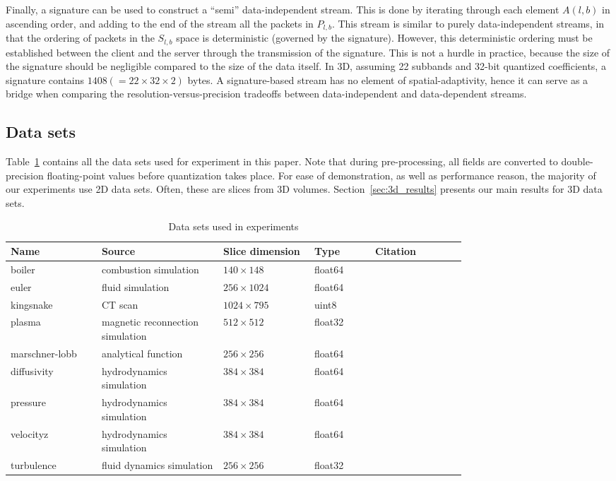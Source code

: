 Finally, a signature can be used to construct a ``semi'' data-independent stream. This is done by
iterating through each element $A(l,b)$ in ascending order, and adding to the end of the stream all
the packets in $P_{l,b}$. This stream is similar to purely data-independent streams, in that the
ordering of packets in the $S_{l,b}$ space is deterministic (governed by the signature). However,
this deterministic ordering must be established between the client and the server through the
transmission of the signature. This is not a hurdle in practice, because the size of the signature
should be negligible compared to the size of the data itself. In 3D, assuming 22 subbands and 32-bit
quantized coefficients, a signature contains $1408 (=22\times 32\times 2)$ bytes. A signature-based
stream has no element of spatial-adaptivity, hence it can serve as a bridge when comparing the
resolution-versus-precision tradeoffs between data-independent and data-dependent streams.

\subsection{Data sets}
\label{sec:data-sets}

Table~\ref{tbl:data-sets} contains all the data sets used for experiment in this paper. Note that
during pre-processing, all fields are converted to double-precision floating-point values before
quantization takes place. For ease of demonstration, as well as performance reason, the majority of
our experiments use 2D data sets. Often, these are slices from 3D volumes.
Section~\ref{sec:3d_results} presents our main results for 3D data sets. 

\begin{table}[t]
  \caption{Data sets used in experiments}
  \centering
  \begin{tabular}{p{0.15\linewidth}p{0.20\linewidth}p{0.15\linewidth}p{0.10\linewidth}p{0.15\linewidth}}
  \hline
  Name & Source & Slice dimension & Type & Citation\\
  \hline
  boiler & combustion simulation& $140\times 148$ & float64 &\\
  euler & fluid simulation& $256\times 1024$ & float64 &\\
  kingsnake & CT scan & $1024\times 795$ & uint8 &\\
  plasma & magnetic reconnection simulation& $512\times 512$ & float32 &\\
  marschner-lobb & analytical function& $256\times 256$ & float64 &\\
  diffusivity & hydrodynamics simulation& $384\times 384$ & float64 &\\
  pressure & hydrodynamics simulation& $384\times 384$ & float64 &\\
  velocityz & hydrodynamics simulation& $384\times 384$ & float64 &\\
  turbulence & fluid dynamics simulation& $256\times 256$ & float32 &\\
  \hline
  \end{tabular}
\label{tbl:data-sets}
\end{table}
